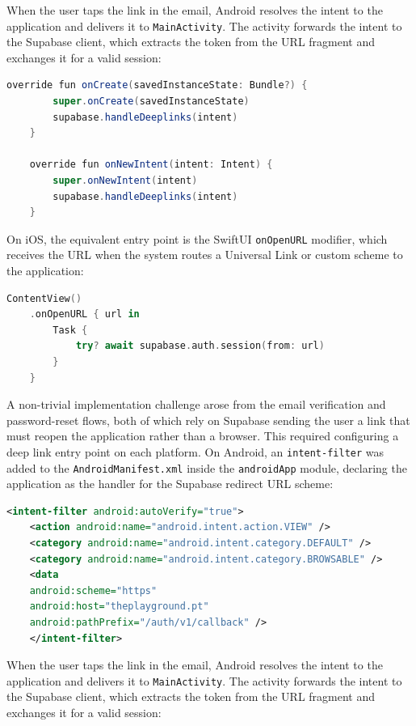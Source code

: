 When the user taps the link in the email, Android resolves the intent to the application and delivers it to \texttt{MainActivity}.
The activity forwards the intent to the Supabase client, which extracts the token from the URL fragment and exchanges it for a valid session:

\begin{lstlisting}[language=java, caption={Deep link handling — androidApp/MainActivity.kt}]
	override fun onCreate(savedInstanceState: Bundle?) {
		super.onCreate(savedInstanceState)
		supabase.handleDeeplinks(intent)
	}
	
	override fun onNewIntent(intent: Intent) {
		super.onNewIntent(intent)
		supabase.handleDeeplinks(intent)
	}
\end{lstlisting}

On iOS, the equivalent entry point is the SwiftUI \texttt{onOpenURL} modifier, which receives the URL when the system routes a Universal Link or custom scheme to the application:

\begin{lstlisting}[language=swift, caption={Deep link handling — iosApp/iOSApp.swift}]
	ContentView()
	.onOpenURL { url in
		Task {
			try? await supabase.auth.session(from: url)
		}
	}
\end{lstlisting}


A non-trivial implementation challenge arose from the email verification and password-reset flows, both of which rely on Supabase sending the user a link that must reopen the application rather than a browser.
This required configuring a deep link entry point on each platform.
On Android, an \texttt{intent-filter} was added to the \texttt{AndroidManifest.xml} inside the \texttt{androidApp} module, declaring the application as the handler for the Supabase redirect URL scheme:

\begin{lstlisting}[language=xml, caption={Deep link intent filter — androidApp/AndroidManifest.xml}]
	<intent-filter android:autoVerify="true">
	<action android:name="android.intent.action.VIEW" />
	<category android:name="android.intent.category.DEFAULT" />
	<category android:name="android.intent.category.BROWSABLE" />
	<data
	android:scheme="https"
	android:host="theplayground.pt"
	android:pathPrefix="/auth/v1/callback" />
	</intent-filter>
\end{lstlisting}

When the user taps the link in the email, Android resolves the intent to the application and delivers it to \texttt{MainActivity}.
The activity forwards the intent to the Supabase client, which extracts the token from the URL fragment and exchanges it for a valid session:

